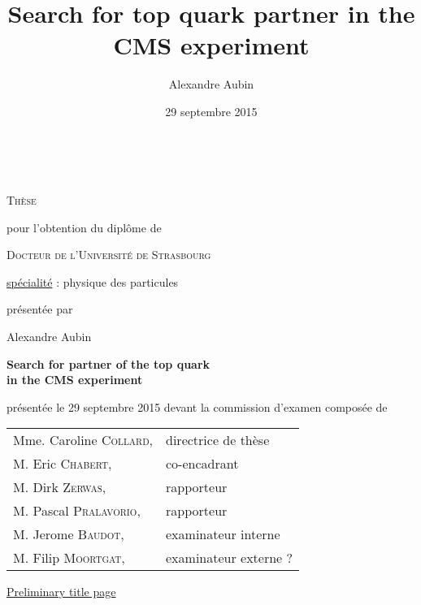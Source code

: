 


\title{Search for top quark partner in the CMS experiment}
\author{Alexandre Aubin}
\date{29 septembre 2015}



\begin{titlepage}
    \vspace*{1cm}
    \begin{center}
        \\

        \vspace*{0.8cm}

        {\Large \textsc{Thèse}}

        \vspace*{0.8cm}

        pour l'obtention du diplôme de

        \vspace*{0.8cm}

        {\Large \textsc{Docteur de l'Université de Strasbourg}}

        \vspace*{0.8cm}

        \underline{spécialité} : physique des particules

        \vspace*{0.8cm}

        présentée par

        Alexandre Aubin

        \vspace*{0.8cm}

        {\Large \textbf{Search for partner of the top quark\\ in the CMS experiment}}

        \vspace*{0.8cm}

        présentée le 29 septembre 2015 devant la commission d'examen composée de

        \vspace*{0.8cm}

        \begin{tabular}{ll}
            Mme. Caroline \textsc{Collard}, & directrice de thèse\\
            M. Eric \textsc{Chabert},       & co-encadrant\\
            M. Dirk \textsc{Zerwas},        & rapporteur\\
            M. Pascal \textsc{Pralavorio},  & rapporteur\\
            M. Jerome \textsc{Baudot},      & examinateur interne\\
            M. Filip \textsc{Moortgat},     & examinateur externe ?\\
        \end{tabular}

        \vspace*{0.5cm}

        \underline{\Huge{Preliminary title page}}

    \end{center}
    \vspace*{1cm}
\end{titlepage}


